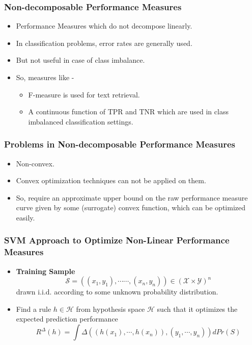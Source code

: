 \documentclass{beamer}
\begin{document}
\begin{frame}
	\frametitle{Non-decomposable Performance Measures}
	\begin{itemize}
		\item Performance Measures which do not decompose linearly.
		\item In classification problems, error rates are generally used.
		\item But not useful in case of class imbalance.
		\item So, measures like -
		\begin{itemize}
			\item F-measure is used for text retrieval.
			\item A continuous function of TPR and TNR which are used in class imbalanced classification settings.
		\end{itemize}
	\end{itemize}
\end{frame}


\begin{frame}
	\frametitle{Problems in Non-decomposable Performance Measures}
	\begin{itemize}
		\item Non-convex.
		\item Convex optimization techniques can not be applied on them.
		\item So, require an approximate upper bound on the raw performance measure curve given by some (surrogate) convex function, which can be optimized easily.
	\end{itemize}
\end{frame}


\begin{frame}
	\frametitle{SVM Approach to Optimize Non-Linear Performance Measures}
	\begin{itemize}
		\item \textbf{Training Sample}
		\begin{equation*}
		\mathcal{S} = ((x_1, y_1), \cdots \cdots, (x_n, y_n)) \in (\mathcal{X}\times \mathcal{Y})^n
		\end{equation*}
		drawn i.i.d. according to some unknown probability distribution.
		\item Find a rule $h \in \mathcal{H}$ from hypothesis space $\mathcal{H}$ such that it optimizes the expected prediction performance
		\begin{equation*}
		R^\Delta(h) = \int \Delta ((h(x_1), \cdots, h(x_n)), (y_1, \cdots, y_n))dPr(S)
		\end{equation*}
	\end{itemize}	
\end{frame}
\end{document}

